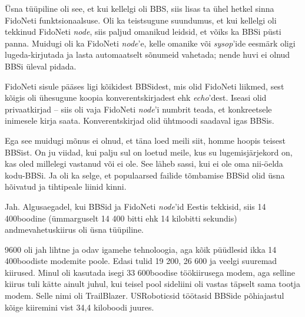 Üsna tüüpiline oli see, et kui kellelgi oli BBS, siis lisas
ta ühel hetkel sinna FidoNeti funktsionaalsuse. Oli ka teistsugune suundumus, et kui kellelgi oli 
tekkinud FidoNeti \emph{node}, siis paljud omanikud 
leidsid, et võiks ka BBSi püsti panna. 
Muidugi oli ka FidoNeti \emph{node}'e, kelle omanike või 
\emph{sysop}'ide eesmärk oligi lugeda-kirjutada ja lasta automaatselt sõnumeid 
vahetada; nende huvi ei olnud BBSi üleval pidada.


FidoNeti sisule pääses ligi kõikidest BBSidest, mis olid FidoNeti liikmed, sest 
kõigis oli ühesugune koopia konverentskirjadest ehk \emph{echo}'dest. 
Iseasi olid privaatkirjad -- siis oli vaja FidoNeti \emph{node}'i numbrit teada, 
et konkreetsele inimesele kirja saata. Konverentskirjad 
olid ühtmoodi saadaval igas BBSis.

Ega see muidugi mõnus ei olnud, et täna loed meili siit, homme hoopis 
teisest BBSist. On ju viidad, kui palju sul on loetud meile, kus 
su lugemisjärjekord on, kas oled millelegi vastanud või ei ole. See läheb 
sassi, kui ei ole oma nii-öelda kodu-BBSi. Ja oli ka selge, et 
populaarsed failide tõmbamise BBSid olid üsna hõivatud ja 
tihtipeale liinid kinni. 


Jah. Algusaegadel, kui BBSid ja FidoNeti \emph{node}'id Eestis tekkisid, 
siis 14 400boodine (ümmarguselt 14 400 
bitti ehk 14 kilobitti sekundis) andmevahetuskiirus oli üsna tüüpiline.


9600 oli jah lihtne ja odav igamehe tehnoloogia, aga kõik püüdlesid ikka 14 400boodiste 
modemite poole. Edasi tulid
19 200, 26 600 ja veelgi suuremad kiirused. Minul oli kasutada isegi
33 600boodise töökiirusega modem, aga selline kiirus tuli 
kätte ainult juhul, kui teisel pool sideliini oli vastas täpselt 
sama tootja modem. Selle nimi oli TrailBlazer. USRoboticsid töötasid BBSide 
põhiajastul kõige kiiremini vist 34,4 kiloboodi juures.

